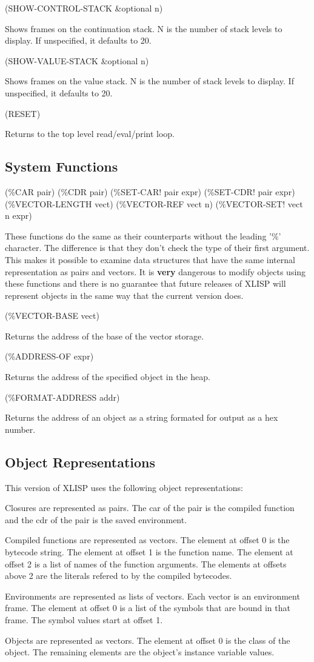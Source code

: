 \documentclass[11pt]{article}
\begin{document}
(SHOW-CONTROL-STACK \&optional n)

Shows frames on the continuation stack.  N is the number of stack levels
to display.  If unspecified, it defaults to 20.

(SHOW-VALUE-STACK \&optional n)

Shows frames on the value stack.  N is the number of stack levels to
display.  If unspecified, it defaults to 20.

(RESET)

Returns to the top level read/eval/print loop.
\subsection{System Functions}
\label{sec-1-47}

(\%CAR pair)
(\%CDR pair)
(\%SET-CAR! pair expr)
(\%SET-CDR! pair expr)
(\%VECTOR-LENGTH vect)
(\%VECTOR-REF vect n)
(\%VECTOR-SET! vect n expr)

These functions do the same as their counterparts without the leading
'\%' character. The difference is that they don't check the type of their
first argument. This makes it possible to examine data structures that
have the same internal representation as pairs and vectors. It is \textbf{very}
dangerous to modify objects using these functions and there is no
guarantee that future releases of XLISP will represent objects in the
same way that the current version does.

(\%VECTOR-BASE vect)

Returns the address of the base of the vector storage.

(\%ADDRESS-OF expr)

Returns the address of the specified object in the heap.

(\%FORMAT-ADDRESS addr)

Returns the address of an object as a string formated for output as a
hex number.

\subsection{Object Representations}
\label{sec-1-48}

This version of XLISP uses the following object representations:

Closures are represented as pairs. The car of the pair is the compiled
function and the cdr of the pair is the saved environment.

Compiled functions are represented as vectors. The element at offset 0
is the bytecode string. The element at offset 1 is the function
name. The element at offset 2 is a list of names of the function
arguments. The elements at offsets above 2 are the literals refered to
by the compiled bytecodes.

Environments are represented as lists of vectors. Each vector is an
environment frame. The element at offset 0 is a list of the symbols that
are bound in that frame. The symbol values start at offset 1.

Objects are represented as vectors. The element at offset 0 is the class
of the object. The remaining elements are the object's instance variable
values.
\end{document}

